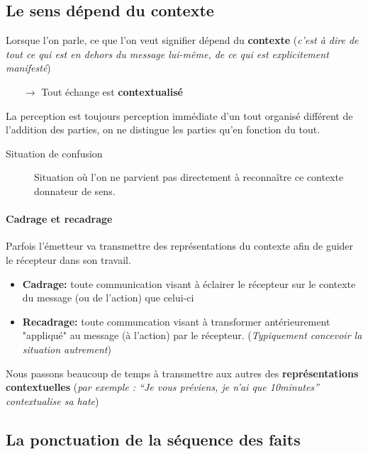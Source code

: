 \documentclass[11pt]{article} %
\begin{document}
\subsection{Le sens dépend du contexte}

Lorsque l'on parle, ce que l'on veut signifier dépend du
\textbf{contexte} (\textit{c'est à dire de tout ce qui est en dehors du
message lui-même, de ce qui est explicitement manifesté})
\begin{itemize}
\item[$\to$] Tout échange est \textbf{contextualisé}
\end{itemize}

La perception est toujours perception immédiate d'un tout organisé
différent de l'addition des parties, on ne distingue les parties qu'en
fonction du tout.

\begin{description}
 \item[Situation de confusion] Situation où l'on ne parvient pas
directement à reconnaître ce contexte donnateur de sens.
\end{description}


\paragraph{Cadrage et recadrage} Parfois l'émetteur va transmettre
des représentations du contexte afin de guider le récepteur dans son
travail.

\begin{itemize}
 \item \textbf{Cadrage:} toute communication visant à éclairer le
récepteur sur le contexte du message (ou de l'action) que celui-ci

 \item \textbf{Recadrage:} toute communcation visant à transformer
antérieurement "appliqué" au message (à l'action) par le récepteur.
(\textit{Typiquement concevoir la situation autrement})
\end{itemize}

Nous passons beaucoup de temps à transmettre aux autres des
\textbf{représentations contextuelles} (\textit{par exemple : ``Je vous
préviens, je n'ai que 10minutes'' contextualise sa hate})

\subsection{La ponctuation de la séquence des faits}
\end{document}
